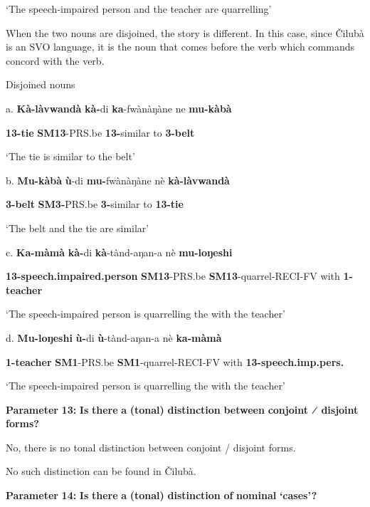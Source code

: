 \documentclass[output=paper]{langscibook}
\begin{document}
\glt ‘The speech-impaired person and the teacher are quarrelling’

When the two nouns are disjoined, the story is different. In this case, since Čilubà is an SVO language, it is the noun that comes before the verb which commands concord with the verb.

\ea%
    \label{ex:lukusa:89}
    \z

           Disjoined nouns 

a.  \textbf{Kà-làvwandà}  \textbf{kà-}di        \textbf{ka}{}-fwànàŋàne    ne    \textbf{mu-kàbà}

\textbf{13-tie}      \textbf{SM13}{}-PRS.be  \textbf{13-}similar      to    \textbf{3-belt}

\glt ‘The tie is similar to the belt’

b.  \textbf{Mu-kàbà}  \textbf{ù}{}-di        \textbf{mu-}fwànàŋàne  nè    \textbf{kà-làvwandà}

\textbf{3-belt}    \textbf{SM3-}PRS.be  \textbf{3-}similar        to    \textbf{13-tie}

\glt ‘The belt and the tie are similar’

c.  \textbf{Ka-màmà}              \textbf{kà-}di        \textbf{kà}{}-tànd-aŋan-a        nè   \textbf{mu-loŋeshi}

\textbf{13-speech.impaired.person}  \textbf{SM13}{}-PRS.be  \textbf{SM13}{}-quarrel-RECI-FV    with   \textbf{1-teacher}

\glt ‘The speech-impaired person is quarrelling the with the teacher’

d. \textbf{Mu-loŋeshi}    \textbf{ù-}di        \textbf{ù}{}-tànd-aŋan-a        nè   \textbf{ka-màmà}

\textbf{1-teacher}    \textbf{SM1}{}-PRS.be  \textbf{SM1}{}-quarrel-RECI-FV  with \textbf{13-speech.imp.pers.}

\glt ‘The speech-impaired person is quarrelling the with the teacher’

\textbf{Parameter} \textbf{13:} \textbf{Is} \textbf{there} \textbf{a} \textbf{(tonal)} \textbf{distinction} \textbf{between} \textbf{conjoint} \textbf{⁄} \textbf{disjoint} \textbf{forms?}

No, there is no tonal distinction between conjoint / disjoint forms.

No such distinction can be found in Čilubà.

\textbf{Parameter} \textbf{14:} \textbf{Is} \textbf{there} \textbf{a} \textbf{(tonal)} \textbf{distinction} \textbf{of} \textbf{nominal} \textbf{‘cases’?}
\end{document}
